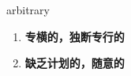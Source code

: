 
\begin{frame}
{\huge arbitrary}
\begin{center}
\begin{enumerate}\Large
  \item \textbf{专横的，独断专行的}
  \item \textbf{缺乏计划的，随意的}
\end{enumerate}
\end{center}
\end{frame}
